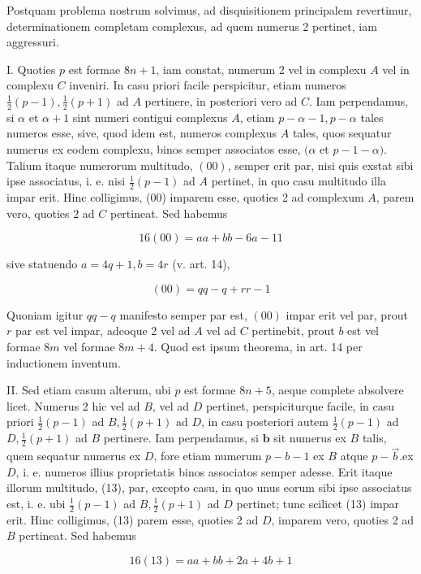 \documentclass[10pt]{article}
\begin{document}
Postquam problema nostrum solvimus, ad disquisitionem principalem revertimur, determinationem completam complexus, ad quem numerus 2 pertinet, iam aggressuri.

I. Quoties \(p\) est formae \(8 n+1\), iam constat, numerum 2 vel in complexu \(A\) vel in complexu \(C\) inveniri. In casu priori facile perspicitur, etiam numeros \(\frac{1}{2}(p-1), \frac{1}{2}(p+1)\) ad \(A\) pertinere, in posteriori vero ad \(C\). Iam perpendamus, si \(\alpha\) et \(\alpha+1\) sint numeri contigui complexus \(A\), etiam \(p-\alpha-1, p-\alpha\) tales numeros esse, sive, quod idem est, numeros complexus \(A\) tales, quos sequatur numerus ex eodem complexu, binos semper associatos esse, \((\alpha\) et \(p-1-\alpha)\). Talium itaque numerorum multitudo, \((00)\), semper erit par, nisi quis exstat sibi ipse associatus, i. e. nisi \(\frac{1}{2}(p-1)\) ad \(A\) pertinet, in quo casu multitudo illa impar erit. Hinc colligimus, (00) imparem esse, quoties 2 ad complexum \(A\), parem vero, quoties 2 ad \(C\) pertineat. Sed habemus

\[
16(00)=a a+b b-6 a-11
\]

sive statuendo \(a=4 q+1, b=4 r\) (v. art. 14),

\[
(00)=q q-q+r r-1
\]

Quoniam igitur \(q q-q\) manifesto semper par est, \((00)\) impar erit vel par, prout \(r\) par est vel impar, adeoque 2 vel ad \(A\) vel ad \(C\) pertinebit, prout \(b\) est vel formae \(8 m\) vel formae \(8 m+4\). Quod est ipsum theorema, in art. 14 per inductionem inventum.

II. Sed etiam casum alterum, ubi \(p\) est formae \(8 n+5\), aeque complete absolvere licet. Numerus 2 hic vel ad \(B\), vel ad \(D\) pertinet, perspiciturque facile, in casu priori \(\frac{1}{2}(p-1)\) ad \(B, \frac{1}{2}(p+1)\) ad \(D\), in casu posteriori autem \(\frac{1}{2}(p-1)\) ad \(D, \frac{1}{2}(p+1)\) ad \(B\) pertinere. Iam perpendamus, si \(\boldsymbol{b}\) sit numerus ex \(B\) talis, quem sequatur numerus ex \(D\), fore etiam numerum \(p-b-1\) ex \(B\) atque \(p-\vec{b}\).ex \(D\), i. e. numeros illius proprietatis binos associatos semper adesse. Erit itaque illorum multitudo, (13), par, excepto casu, in quo unus eorum sibi ipse associatus est, i. e. ubi \(\frac{1}{2}(p-1)\) ad \(B, \frac{1}{2}(p+1)\) ad \(D\) pertinet; tunc scilicet (13) impar erit. Hinc colligimus, (13) parem esse, quoties 2 ad \(D\), imparem vero, quoties 2 ad \(B\) pertineat. Sed habemus

\[
16(13)=a a+b b+2 a+4 b+1
\]
\end{document}

